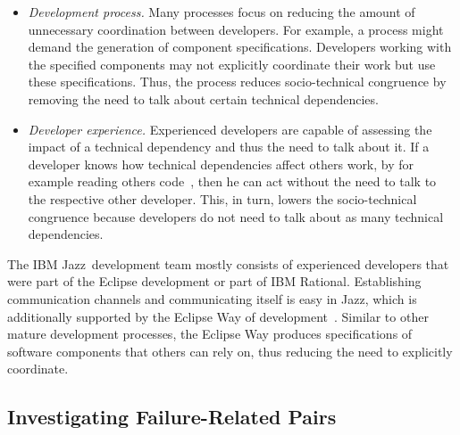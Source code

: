 \documentclass{sig-alternate}
\newenvironment{mynote}%
{\medskip
\noindent
\vspace{2pt}
\let\emph=\textbf
\begin{boxedminipage}{.99\columnwidth}\em}%
{\end{boxedminipage}}
\begin{document}
\begin{itemize}
\item \emph{Development process.} 
Many processes focus on reducing the amount of unnecessary coordination between developers.
For example, a process might demand the generation of component specifications.
Developers working with the specified components may not explicitly
coordinate their work but use these specifications. Thus, the process reduces socio-technical congruence by removing the need to talk about certain technical dependencies.
\item \emph{Developer experience.} Experienced developers are capable of assessing the impact of a technical dependency and thus the need to talk about it.
If a developer knows how technical dependencies affect others work, by for example reading others code~\cite{bolici:stc:2009}, then he can act without the need to talk to the respective other developer.
This, in turn, lowers the socio-technical congruence because developers do not need to talk about as many technical dependencies.
\end{itemize}

The IBM Jazz\texttrademark\ development team mostly consists of experienced
developers that were part of the Eclipse development or part of IBM
Rational\texttrademark. 
Establishing communication channels and
communicating itself is easy in Jazz\texttrademark, which is additionally supported by the Eclipse Way of development~\cite{Frost:2007ff}. 
Similar
to other mature development processes, the Eclipse Way produces specifications of software components that others can rely on, thus reducing the need to explicitly  coordinate.




\subsection{Investigating Failure-Related Pairs}
\end{document}
